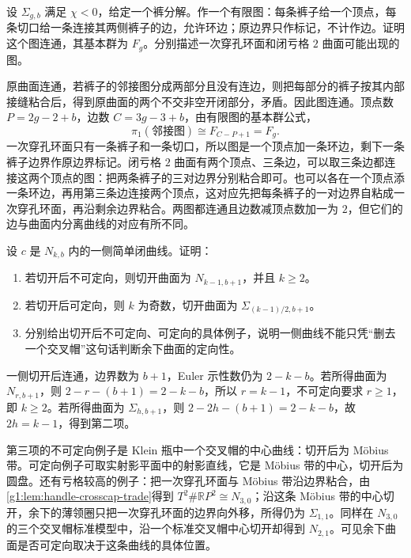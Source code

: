 \begin{exercise}\label{g1:ex:pants-dual-graph}
	设 \(\Sigma_{g,b}\) 满足 \(\chi<0\)，给定一个裤分解。作一个有限图：每条裤子给一个顶点，每条切口给一条连接其两侧裤子的边，允许环边；原边界只作标记，不计作边。证明这个图连通，其基本群为 \(F_g\)。分别描述一次穿孔环面和闭亏格 \(2\) 曲面可能出现的图。
\end{exercise}
\begin{solution}
	原曲面连通，若裤子的邻接图分成两部分且没有连边，则把每部分的裤子按其内部接缝粘合后，得到原曲面的两个不交非空开闭部分，矛盾。因此图连通。顶点数 \(P=2g-2+b\)，边数 \(C=3g-3+b\)，由有限图的基本群公式，
	\[
		\pi_1(\text{邻接图})\cong F_{C-P+1}=F_g.
	\]
	一次穿孔环面只有一条裤子和一条切口，所以图是一个顶点加一条环边，剩下一条裤子边界作原边界标记。闭亏格 \(2\) 曲面有两个顶点、三条边，可以取三条边都连接这两个顶点的图：把两条裤子的三对边界分别粘合即可。也可以各在一个顶点添一条环边，再用第三条边连接两个顶点，这对应先把每条裤子的一对边界自粘成一次穿孔环面，再沿剩余边界粘合。两图都连通且边数减顶点数加一为 \(2\)，但它们的边与曲面内分离曲线的对应有所不同。
\end{solution}

\begin{exercise}\label{g1:ex:one-sided-cut-orientation}
	设 \(c\) 是 \(N_{k,b}\) 内的一侧简单闭曲线。证明：
	\begin{enumerate}
		\item 若切开后不可定向，则切开曲面为 \(N_{k-1,b+1}\)，并且 \(k\ge2\)。
		\item 若切开后可定向，则 \(k\) 为奇数，切开曲面为 \(\Sigma_{(k-1)/2,b+1}\)。
		\item 分别给出切开后不可定向、可定向的具体例子，说明一侧曲线不能只凭“删去一个交叉帽”这句话判断余下曲面的定向性。
	\end{enumerate}
\end{exercise}
\begin{solution}
	一侧切开后连通，边界数为 \(b+1\)，Euler 示性数仍为 \(2-k-b\)。若所得曲面为 \(N_{r,b+1}\)，则 \(2-r-(b+1)=2-k-b\)，所以 \(r=k-1\)，不可定向要求 \(r\ge1\)，即 \(k\ge2\)。若所得曲面为 \(\Sigma_{h,b+1}\)，则 \(2-2h-(b+1)=2-k-b\)，故 \(2h=k-1\)，得到第二项。

	第三项的不可定向例子是 Klein 瓶中一个交叉帽的中心曲线：切开后为 Möbius 带。可定向例子可取实射影平面中的射影直线，它是 Möbius 带的中心，切开后为圆盘。还有亏格较高的例子：把一次穿孔环面与 Möbius 带沿边界粘合，由\cref{g1:lem:handle-crosscap-trade}得到 \(T^2\#\mathbb RP^2\cong N_{3,0}\)；沿这条 Möbius 带的中心切开，余下的薄领圈只把一次穿孔环面的边界向外移，所得仍为 \(\Sigma_{1,1}\)。同样在 \(N_{3,0}\) 的三个交叉帽标准模型中，沿一个标准交叉帽中心切开却得到 \(N_{2,1}\)。可见余下曲面是否可定向取决于这条曲线的具体位置。
\end{solution}
